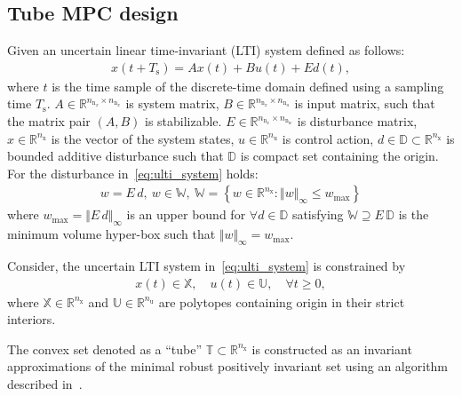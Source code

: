 \documentclass[letterpaper, 10 pt, conference]{ieeeconf}
\begin{document}
\subsection{Tube MPC design}
\label{sec:tube_mpc}

Given an uncertain linear time-invariant (LTI) system defined as follows:
\begin{eqnarray}
	\label{eq:ulti_system}
	x(t+T_{\mathrm{s}}) = A x(t) + B u(t) + E d(t), %
\end{eqnarray}
where $t$ is the time sample of the discrete-time domain defined using a sampling time $T_{\mathrm{s}}$. $A \in \mathbb{R}^{n_{\mathrm{n}_{x}} \times n_{\mathrm{n}_{x}}}$ is system matrix, $B \in \mathbb{R}^{n_{\mathrm{n}_{x}} \times n_{\mathrm{n}_{u}}}$ is input matrix, such that the matrix pair $(A,B)$ is stabilizable. $E \in \mathbb{R}^{n_{\mathrm{n}_{x}} \times n_{\mathrm{n}_{w}}}$ is disturbance matrix, $x \in \mathbb{R}^{n_{\mathrm{x}}}$ is the vector of the system states, $u \in \mathbb{R}^{n_{\mathrm{u}}}$ is control action, $d \in \mathbb{D} \subset \mathbb{R}^{n_{\mathrm{x}}}$ is bounded additive disturbance such that $\mathbb{D}$ is compact set containing the origin. 
For the disturbance in~\eqref{eq:ulti_system} holds:
\begin{eqnarray}
	\label{eq:disturbance_set}
	w = E \, d, ~ w \in \mathbb{W}, ~ \mathbb{W} = \left\{ w \in \mathbb{R}^{n_{\mathrm{x}}} : \Vert w \Vert_{\infty} \leq w_{\max} \right\}
\end{eqnarray}
where $w_{\max} = \Vert E \, d \Vert_{\infty}$ is an upper bound for $\forall d \in \mathbb{D}$ satisfying $\mathbb{W} \supseteq E \, \mathbb{D}$ is the minimum volume hyper-box such that $\Vert w \Vert_{\infty} = w_{\max}$.

Consider, the uncertain LTI system in~\eqref{eq:ulti_system} is constrained by
\begin{eqnarray}
	\label{eq:constraints_x_u}
	x(t) \in \mathbb{X}, \quad u(t) \in \mathbb{U}, \quad \forall t \geq 0,
\end{eqnarray}
where $\mathbb{X} \in \mathbb{R}^{n_{\mathrm{x}}}$ and $\mathbb{U} \in \mathbb{R}^{n_{\mathrm{u}}}$ are polytopes containing origin in their strict interiors. 

The convex set denoted as a ``tube'' $\mathbb{T} \subset \mathbb{R}^{n_{\mathrm{x}}}$ is  constructed as an invariant approximations of the minimal robust positively invariant set using an algorithm described in~\cite{RK05}.

\end{document}
